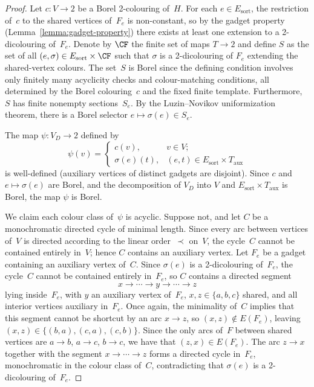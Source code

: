 \begin{proof}
	Let $c\colon V\to 2$ be a Borel 2-colouring of~$H$.
	For each $e\in E_{\mathrm{sort}}$, the restriction of~$c$ to the shared vertices of~$F_e$ is non-constant, so by the gadget property (Lemma~\ref{lemma:gadget-property}) there exists at least one extension to a 2-dicolouring of~$F_e$.
	Denote by $\CF$ the finite set of maps $T\to 2$ and define $S$ as the set of all $(e,\sigma)\in E_{\mathrm{sort}}\times\CF$ such that $\sigma$ is a 2-dicolouring of $F_e$ extending the shared-vertex colours.
	The set~$S$ is Borel since the defining condition involves only finitely many acyclicity checks and colour-matching conditions, all determined by the Borel colouring~$c$ and the fixed finite template.
	Furthermore, $S$ has finite nonempty sections~$S_e$.
	By the Luzin--Novikov uniformization theorem, there is a Borel selector $e\mapsto\sigma(e)\in S_e$.

	The map $\psi\colon V_D\to 2$ defined by
	$$\psi(v) =\begin{cases}c(v),&v\in V;\\
		\sigma(e)(t),&(e,t)\in E_{\mathrm{sort}}\times T_{\mathrm{aux}}\end{cases}$$
	is well-defined (auxiliary vertices of distinct gadgets are disjoint). Since $c$ and $e\mapsto\sigma(e)$ are Borel, and the decomposition of $V_D$ into $V$ and $E_{\mathrm{sort}}\times T_{\mathrm{aux}}$ is Borel, the map $\psi$ is Borel.

	We claim each colour class of~$\psi$ is acyclic.
	Suppose not, and let $C$ be a monochromatic directed cycle of minimal length.
	Since every arc between vertices of~$V$ is directed according to the linear order~$\prec$ on~$V$, the cycle~$C$ cannot be contained entirely in~$V$; hence $C$ contains an auxiliary vertex.
	Let $F_e$ be a gadget containing an auxiliary vertex of~$C$.
	Since $\sigma(e)$ is a 2-dicolouring of~$F_e$, the cycle~$C$ cannot be contained entirely in~$F_e$, so $C$ contains a directed segment $$x\to\cdots\to y\to\cdots\to z$$ lying inside~$F_e$, with $y$ an auxiliary vertex of~$F_e$, $x,z\in\{a,b,c\}$ shared, and all interior vertices auxiliary in~$F_e$.
	Once again, the minimality of~$C$ implies that this segment cannot be shortcut by an arc $x\to z$, so $(x,z)\notin E(F_e)$, leaving $(x,z)\in\{(b,a),(c,a),(c,b)\}$.
	Since the only arcs of~$F$ between shared vertices are $a\to b$, $a\to c$, $b\to c$, we have that $(z,x)\in E(F_e)$.
	The arc $z\to x$ together with the segment $x\to\cdots\to z$ forms a directed cycle in~$F_e$, monochromatic in the colour class of~$C$, contradicting that $\sigma(e)$ is a 2-dicolouring of~$F_e$.
\end{proof}

